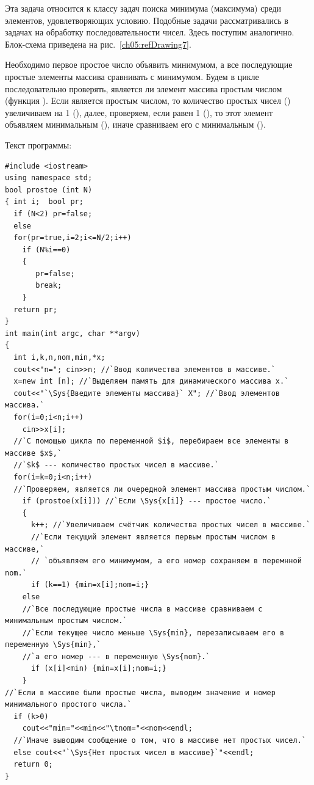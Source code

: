 Эта задача относится к классу задач поиска минимума (максимума) среди элементов, удовлетворяющих условию. Подобные
задачи рассматривались в задачах на обработку последовательности чисел. Здесь поступим аналогично. Блок-схема приведена
на рис.~\ref{ch05:refDrawing7}.

Необходимо первое простое число объявить минимумом, а все последующие простые элементы массива сравнивать с минимумом.
Будем в цикле последовательно проверять, является ли элемент массива простым числом (функция
). Если  является простым числом, то количество простых чисел
() увеличиваем на 1 (), далее, проверяем, если равен 1
(), то этот элемент объявляем минимальным (), иначе
сравниваем его с минимальным ().

Текст программы:
\begin{lstlisting}
#include <iostream>
using namespace std;
bool prostoe (int N)
{ int i;  bool pr;
  if (N<2) pr=false;
  else
  for(pr=true,i=2;i<=N/2;i++)
    if (N%i==0)
    {
       pr=false;
       break;
    }
  return pr;
}
int main(int argc, char **argv)
{
  int i,k,n,nom,min,*x;
  cout<<"n="; cin>>n; //`Ввод количества элементов в массиве.`
  x=new int [n]; //`Выделяем память для динамического массива x.`
  cout<<"`\Sys{Введите элементы массива}` X"; //`Ввод элементов массива.`
  for(i=0;i<n;i++)
    cin>>x[i];
  //`С помощью цикла по переменной $i$, перебираем все элементы в массиве $x$,` 
  //`$k$ --- количество простых чисел в массиве.`
  for(i=k=0;i<n;i++)
  //`Проверяем, является ли очередной элемент массива простым числом.` 
    if (prostoe(x[i])) //`Если \Sys{x[i]} --- простое число.`
    {
      k++; //`Увеличиваем счётчик количества простых чисел в массиве.`
      //`Если текущий элемент является первым простым числом в массиве,`
      // `объявляем его минимумом, а его номер сохраняем в перемнной nom.`
      if (k==1) {min=x[i];nom=i;}
    else
    //`Все последующие простые числа в массиве сравниваем с минимальным простым числом.`
    //`Если текущее число меньше \Sys{min}, перезаписываем его в переменную \Sys{min},`
    //`а его номер --- в переменную \Sys{nom}.`
      if (x[i]<min) {min=x[i];nom=i;}
    }
//`Если в массиве были простые числа, выводим значение и номер минимального простого числа.`
  if (k>0)
    cout<<"min="<<min<<"\tnom="<<nom<<endl;
  //`Иначе выводим сообщение о том, что в массиве нет простых чисел.`
  else cout<<"`\Sys{Нет простых чисел в массиве}`"<<endl;
  return 0;
}
\end{lstlisting}


